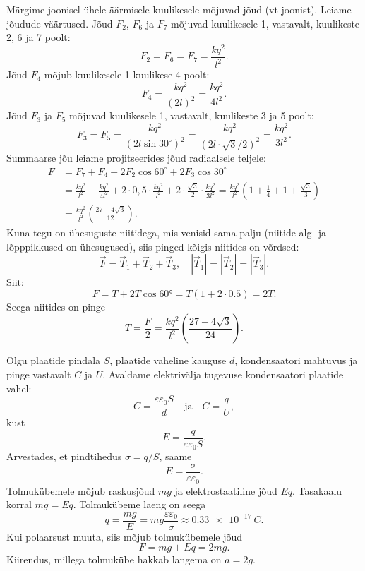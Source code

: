 \documentclass[10pt]{article}
\begin{document}
{Märgime joonisel ühele äärmisele kuulikesele mõjuvad jõud (vt joonist). Leiame jõudude väärtused. Jõud $F_2$, $F_6$ ja $F_7$ mõjuvad kuulikesele 1, vastavalt, kuulikeste 2, 6 ja 7 poolt:
\[
F_2 = F_6 = F_7 = \frac{kq^2}{l^2}.
\]
Jõud $F_4$ mõjub kuulikesele 1 kuulikese 4 poolt:
\[
F_{4}=\frac{k q^{2}}{(2 l)^{2}}=\frac{k q^{2}}{4 l^{2}}.
\]
Jõud $F_3$ ja $F_5$ mõjuvad kuulikesele 1, vastavalt, kuulikeste 3 ja 5 poolt:
\[
F_{3}=F_{5}=\frac{k q^{2}}{\left(2 l \sin 30^{\circ}\right)^{2}}=\frac{k q^{2}}{(2 l \cdot \sqrt{3} / 2)^{2}}=\frac{k q^{2}}{3 l^{2}}.
\]
Summaarse jõu leiame projitseerides jõud radiaalsele teljele:
\[
\begin{aligned}
F&=F_{7}+F_{4}+2 F_{2} \cos 60^{\circ}+2 F_{3} \cos 30^{\circ}\\
&=\frac{k q^{2}}{l^{2}}+\frac{k q^{2}}{4 l^{2}}+2 \cdot 0,5 \cdot \frac{k q^{2}}{l^{2}}+2 \cdot \frac{\sqrt{3}}{2} \cdot \frac{k q^{2}}{3 l^{2}}=\frac{k q^{2}}{l^{2}}\left(1+\frac{1}{4}+1+\frac{\sqrt{3}}{3}\right)\\
&=\frac{k q^{2}}{l^{2}}\left(\frac{27+4 \sqrt{3}}{12}\right).
\end{aligned}
\]
Kuna tegu on ühesuguste niitidega, mis venisid sama palju (niitide alg- ja lõpppikkused on ühesugused), siis pinged kõigis niitides on võrdsed: 
\[
\vec{F}=\vec{T}_{1}+\vec{T}_{2}+\vec{T}_{3}, \quad\left|\vec{T}_{1}\right|=\left|\vec{T}_{2}\right|=\left|\vec{T}_{3}\right|.
\]
Siit:
\[
F = T + 2T \cos \ang{60} = T (\num{1} + \num{2} \cdot \num{0,5}) = 2T.
\]
Seega niitides on pinge
\[
T=\frac{F}{2}=\frac{k q^{2}}{l^{2}}\left(\frac{27+4 \sqrt{3}}{24}\right).
\]
\probend
\bigskip


\solu
Olgu plaatide pindala $S$, plaatide vaheline kauguse $d$, kondensaatori mahtuvus ja pinge vastavalt $C$ ja $U$. Avaldame elektrivälja tugevuse kondensaatori plaatide vahel:
\[
C=\frac{\varepsilon \varepsilon_{0} S}{d} \quad \text{ja} \quad C=\frac{q}{U},
\]
kust
\[
E=\frac{q}{\varepsilon \varepsilon_{0} S}.
\]
Arvestades, et pindtihedus $\sigma = q/S$, saame
\[
E = \frac{\sigma}{\varepsilon\varepsilon_0}.
\]
Tolmukübemele mõjub raskusjõud $mg$ ja elektrostaatiline jõud $Eq$. Tasakaalu korral $mg = Eq$. Tolmukübeme laeng on seega
\[
q=\frac{m g}{E}=m g \frac{\varepsilon \varepsilon_{0}}{\sigma} \approx \SI{0,33e-17}{C}.
\]
Kui polaarsust muuta, siis mõjub tolmukübemele jõud
\[
F = mg + Eq = 2mg.
\]
Kiirendus, millega tolmukübe hakkab langema on $a = 2g$.
\probend
\bigskip

}
\end{document}
